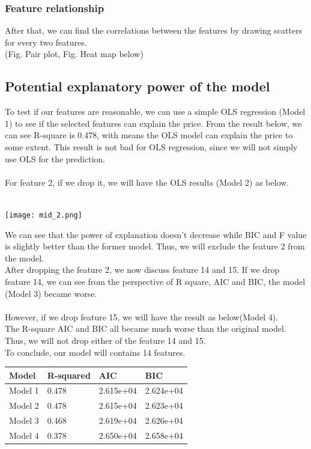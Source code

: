 \documentclass{article}
\begin{document}
\subsubsection{Feature relationship}
After that, we can find the correlations between the features by drawing scatters for every two features.\\
(Fig. Pair plot, Fig. Heat map below)

\subsection{Potential explanatory power of the model}
To test if our features are reasonable, we can use a simple OLS regression (Model 1) to see if the selected features can explain the price. From the result below, we can see R-square is 0.478, with means the OLS model can explain the price to some extent. This result is not bad for OLS regression, since we will not simply use OLS for the prediction. \\
\\
For feature 2, if we drop it, we will have the OLS results (Model 2) as below.\\
\\
\begin{center}
\texttt{[image: mid\_2.png]} \\
\end{center}


We can see that the power of explanation doesn’t decrease while BIC and F value is slightly better than the former model. Thus, we will exclude the feature 2 from the model. \\
After dropping the feature 2, we now discuss feature 14 and 15. If we drop feature 14, we can see from the perspective of R square, AIC and BIC, the model (Model 3) became worse. \\
\\
However, if we drop feature 15, we will have the result as below(Model 4). \\
The R-square AIC and BIC all became much worse than the original model. Thus, we will not drop either of the feature 14 and 15. \\
To conclude, our model will contains 14 features.

\begin{center}
\begin{tabular}{m{2cm}<{\centering}|m{3.5cm}<{\centering}|m{4cm}<{\centering}|m{2cm}<{\centering}}
Model & R-squared & AIC & BIC \\
\hline
Model 1 & 0.478 & 2.615e+04 & 2.624e+04\\
\hline
Model 2 & 0.478 & 2.615e+04 & 2.623e+04 \\
\hline
Model 3 & 0.468 & 2.619e+04 & 2.626e+04 \\
\hline
Model 4 & 0.378 & 2.650e+04 & 2.658e+04\\

\end{tabular}
\end{center}
\end{document}
